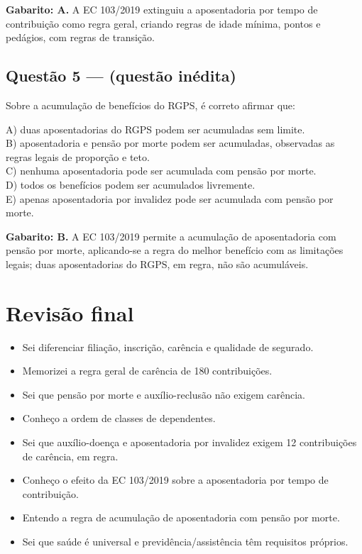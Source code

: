 \documentclass[11pt,a4paper]{article}
\begin{document}
\begin{alerta}
\textbf{Gabarito: A.} A EC 103/2019 extinguiu a aposentadoria por tempo de contribuição como regra geral, criando regras de idade mínima, pontos e pedágios, com regras de transição.
\end{alerta}

\subsection*{Questão 5 — (questão inédita)}

Sobre a acumulação de benefícios do RGPS, é correto afirmar que:

A) duas aposentadorias do RGPS podem ser acumuladas sem limite. \\ B) aposentadoria e pensão por morte podem ser acumuladas, observadas as regras legais de proporção e teto. \\ C) nenhuma aposentadoria pode ser acumulada com pensão por morte. \\ D) todos os benefícios podem ser acumulados livremente. \\ E) apenas aposentadoria por invalidez pode ser acumulada com pensão por morte.

\begin{alerta}
\textbf{Gabarito: B.} A EC 103/2019 permite a acumulação de aposentadoria com pensão por morte, aplicando-se a regra do melhor benefício com as limitações legais; duas aposentadorias do RGPS, em regra, não são acumuláveis.
\end{alerta}

\section*{Revisão final}

\begin{itemize}
  \item[$\square$] Sei diferenciar filiação, inscrição, carência e qualidade de segurado.
  \item[$\square$] Memorizei a regra geral de carência de 180 contribuições.
  \item[$\square$] Sei que pensão por morte e auxílio-reclusão não exigem carência.
  \item[$\square$] Conheço a ordem de classes de dependentes.
  \item[$\square$] Sei que auxílio-doença e aposentadoria por invalidez exigem 12 contribuições de carência, em regra.
  \item[$\square$] Conheço o efeito da EC 103/2019 sobre a aposentadoria por tempo de contribuição.
  \item[$\square$] Entendo a regra de acumulação de aposentadoria com pensão por morte.
  \item[$\square$] Sei que saúde é universal e previdência/assistência têm requisitos próprios.
\end{itemize}
\end{document}

